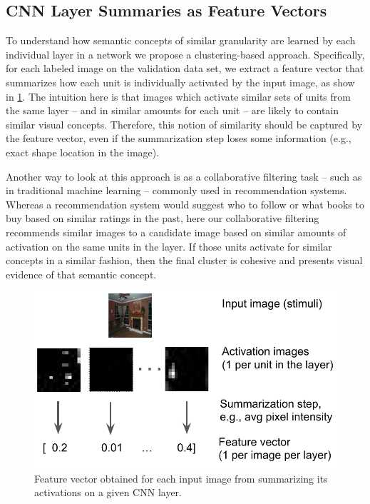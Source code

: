 \subsection{CNN Layer Summaries as Feature Vectors}


To understand how semantic concepts of similar granularity are learned by each individual layer in a network we propose a clustering-based approach.  Specifically, for each labeled image on the validation data set, we extract a feature vector that summarizes how each unit is individually activated by the input image, as show in \ref{fig:vectorization}.  The intuition here is that images which activate similar sets of units from the same layer -- and in similar amounts for each unit -- are likely to contain similar visual concepts.  Therefore, this notion of similarity should be captured by the  feature vector, even if the summarization step loses some information (e.g., exact shape location in the image).

Another way to look at this approach is as a collaborative filtering task -- such as in traditional machine learning -- commonly used in recommendation systems.  Whereas a recommendation system would suggest who to follow or what books to buy based on similar ratings in the past, here our collaborative filtering recommends similar images to a candidate image based on similar amounts of activation on the same units in the layer.  If those units activate for similar concepts in a similar fashion, then the final cluster is cohesive and presents visual evidence of that semantic concept. 

\begin{figure}[t]
\centering
\includegraphics[width=\columnwidth]{figures/vectorization}
\caption{Feature vector obtained for each input image from summarizing its activations on a given CNN layer.}
\label{fig:vectorization}
\end{figure}